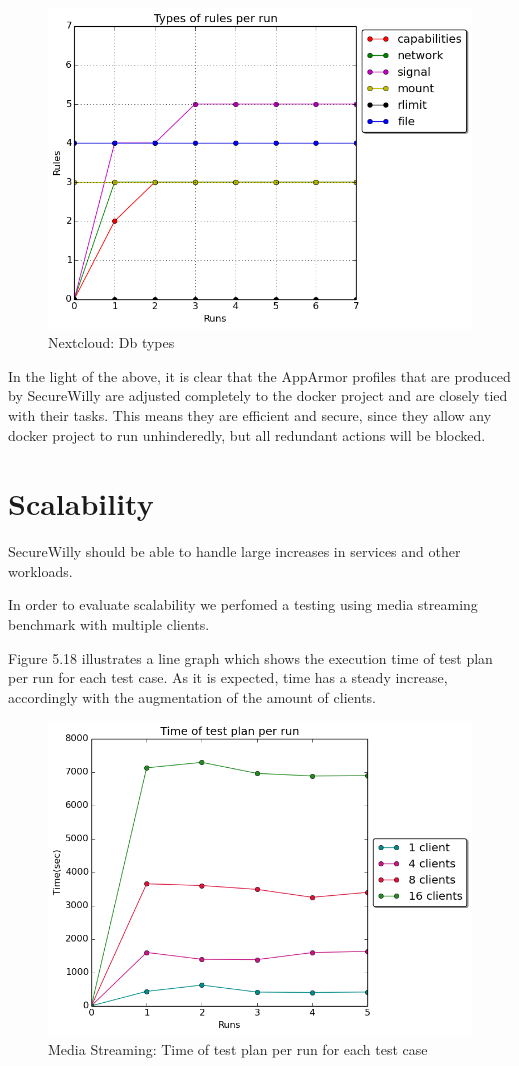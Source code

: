 \begin{figure}[h!]
  \centering
   \includegraphics[width=0.68\linewidth]{../figures/nextcloud/types_db.png}
   \caption{Nextcloud: Db types}
\end{figure}
In the light of the above, it is clear that the AppArmor profiles that are produced by SecureWilly are adjusted completely to the docker project and are closely tied with their tasks. This means they are efficient and secure, since they allow any docker project to run unhinderedly, but all redundant actions will be blocked.\\

\section{Scalability}
SecureWilly should be able to handle large increases in services and other workloads. 

In order to evaluate scalability we perfomed a testing using media streaming benchmark with multiple clients.

Figure 5.18 illustrates a line graph which shows the execution time of test plan per run for each test case. As it is expected, time has a steady increase, accordingly with the augmentation of the amount of clients.

\begin{figure}[h!]
  \centering
   \includegraphics[width=0.8\linewidth]{../figures/scalability/time1_4_8_16.png}
   \caption{Media Streaming: Time of test plan per run for each test case}
\end{figure}

